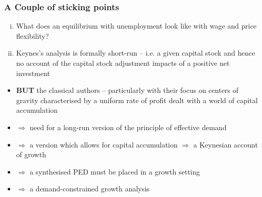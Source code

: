 \documentclass[a4paper,twoside]{article}
\numberwithin{equation}{section}
\numberwithin{figure}{section}
\begin{document}
\subsubsection{A Couple of sticking points}
	\begin{enumerate}[(i)]
		\item What does an equilibrium with unemployment look like with wage and price flexibility?
		\item Keynes's analysis is formally short-run -- i.e. a given capital stock and hence no account of the capital stock adjustment impacts of a positive net investment
	\end{enumerate}
	\begin{itemize}
		\item \textbf{BUT} the classical authors -- particularly with their focus on centers of gravity characterised by a uniform rate of profit dealt with a world of capital accumulation
		\item \textcolor{myred}{\( \Rightarrow \) need for a long-run version of the principle of effective demand}
		\item \textcolor{myred}{\( \Rightarrow \) a version which allows for capital accumulation \( \Rightarrow \) a Keynesian account of growth}
		\item \( \Rightarrow \) a synthesised PED must be placed in a growth setting
		\item \( \Rightarrow \) a demand-constrained growth analysis
	\end{itemize}
\end{document}
